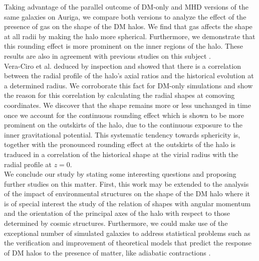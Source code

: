 Taking advantage of the parallel outcome of DM-only and MHD versions of the same galaxies on Auriga, we compare both versions to analyze the effect of the presence of gas on the shape of the DM halos. We find that gas affects the shape at all radii by making the halo more spherical. Furthermore, we demonstrate that this rounding effect is more prominent on the inner regions of the halo. These results are also in agreement with previous studies on this subject \cite{Barnes_and_Hernquist_1996,Springel_et_al._2004,Bryan_et_al._2013}.\\

Vera-Ciro et al. deduced by inspection and showed that there is a correlation between the radial profile of the halo's axial ratios and the historical evolution at a determined radius. We corroborate this fact for DM-only simulations and show the reason for this correlation by calculating the radial shapes at comoving coordinates. We discover that the shape remains more or less unchanged in time once we account for the continuous rounding effect which is shown to be more prominent on the outskirts of the halo, due to the continuous exposure to the inner gravitational potential. This systematic tendency towards sphericity is, together with the pronounced rounding effect at the outskirts of the halo is traduced in a correlation of the historical shape at the virial radius with the radial profile at $z=0$.\\

We conclude our study by stating some interesting questions and proposing further studies on this matter. First, this work may be extended to the analysis of the impact of environmental structures on the shape of the DM halo where it is of special interest the study of the relation of shapes with angular momentum and the orientation of the principal axes of the halo with respect to those determined by cosmic structures. Furthermore, we could make use of the exceptional number of simulated galaxies to address statistical problems such as the verification and improvement of theoretical models that predict the response of DM halos to the presence of matter, like adiabatic contractions \cite{Gnedin_et_al._2004}. \\




 
 
